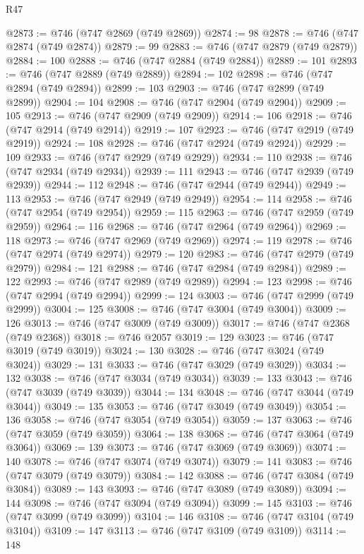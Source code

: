 \begin{lexlean}{R47}
\begin{coremodule}
@2873 := @746 (@747 @2869 (@749 @2869))
@2874 := 98
@2878 := @746 (@747 @2874 (@749 @2874))
@2879 := 99
@2883 := @746 (@747 @2879 (@749 @2879))
@2884 := 100
@2888 := @746 (@747 @2884 (@749 @2884))
@2889 := 101
@2893 := @746 (@747 @2889 (@749 @2889))
@2894 := 102
@2898 := @746 (@747 @2894 (@749 @2894))
@2899 := 103
@2903 := @746 (@747 @2899 (@749 @2899))
@2904 := 104
@2908 := @746 (@747 @2904 (@749 @2904))
@2909 := 105
@2913 := @746 (@747 @2909 (@749 @2909))
@2914 := 106
@2918 := @746 (@747 @2914 (@749 @2914))
@2919 := 107
@2923 := @746 (@747 @2919 (@749 @2919))
@2924 := 108
@2928 := @746 (@747 @2924 (@749 @2924))
@2929 := 109
@2933 := @746 (@747 @2929 (@749 @2929))
@2934 := 110
@2938 := @746 (@747 @2934 (@749 @2934))
@2939 := 111
@2943 := @746 (@747 @2939 (@749 @2939))
@2944 := 112
@2948 := @746 (@747 @2944 (@749 @2944))
@2949 := 113
@2953 := @746 (@747 @2949 (@749 @2949))
@2954 := 114
@2958 := @746 (@747 @2954 (@749 @2954))
@2959 := 115
@2963 := @746 (@747 @2959 (@749 @2959))
@2964 := 116
@2968 := @746 (@747 @2964 (@749 @2964))
@2969 := 118
@2973 := @746 (@747 @2969 (@749 @2969))
@2974 := 119
@2978 := @746 (@747 @2974 (@749 @2974))
@2979 := 120
@2983 := @746 (@747 @2979 (@749 @2979))
@2984 := 121
@2988 := @746 (@747 @2984 (@749 @2984))
@2989 := 122
@2993 := @746 (@747 @2989 (@749 @2989))
@2994 := 123
@2998 := @746 (@747 @2994 (@749 @2994))
@2999 := 124
@3003 := @746 (@747 @2999 (@749 @2999))
@3004 := 125
@3008 := @746 (@747 @3004 (@749 @3004))
@3009 := 126
@3013 := @746 (@747 @3009 (@749 @3009))
@3017 := @746 (@747 @2368 (@749 @2368))
@3018 := @746 @2057
@3019 := 129
@3023 := @746 (@747 @3019 (@749 @3019))
@3024 := 130
@3028 := @746 (@747 @3024 (@749 @3024))
@3029 := 131
@3033 := @746 (@747 @3029 (@749 @3029))
@3034 := 132
@3038 := @746 (@747 @3034 (@749 @3034))
@3039 := 133
@3043 := @746 (@747 @3039 (@749 @3039))
@3044 := 134
@3048 := @746 (@747 @3044 (@749 @3044))
@3049 := 135
@3053 := @746 (@747 @3049 (@749 @3049))
@3054 := 136
@3058 := @746 (@747 @3054 (@749 @3054))
@3059 := 137
@3063 := @746 (@747 @3059 (@749 @3059))
@3064 := 138
@3068 := @746 (@747 @3064 (@749 @3064))
@3069 := 139
@3073 := @746 (@747 @3069 (@749 @3069))
@3074 := 140
@3078 := @746 (@747 @3074 (@749 @3074))
@3079 := 141
@3083 := @746 (@747 @3079 (@749 @3079))
@3084 := 142
@3088 := @746 (@747 @3084 (@749 @3084))
@3089 := 143
@3093 := @746 (@747 @3089 (@749 @3089))
@3094 := 144
@3098 := @746 (@747 @3094 (@749 @3094))
@3099 := 145
@3103 := @746 (@747 @3099 (@749 @3099))
@3104 := 146
@3108 := @746 (@747 @3104 (@749 @3104))
@3109 := 147
@3113 := @746 (@747 @3109 (@749 @3109))
@3114 := 148

\end{coremodule}
\end{lexlean}
